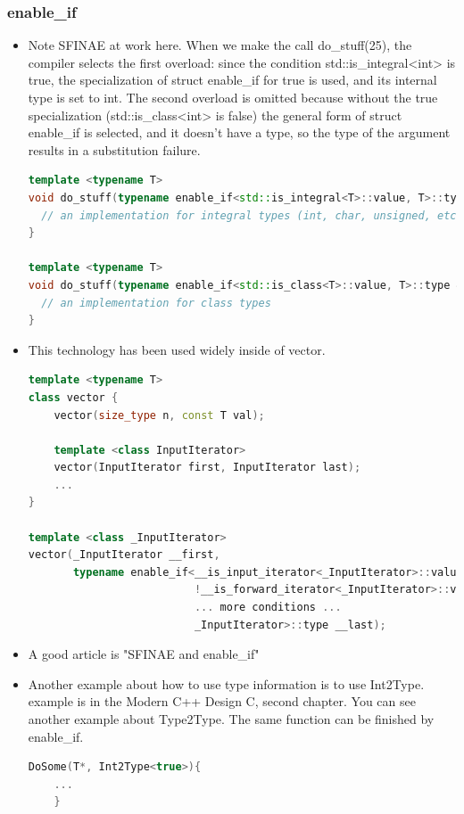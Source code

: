 \documentclass[a4paper,12pt,twoside]{book}
\begin{document}
\subsubsection{enable\_if}
\begin{itemize}

\item Note SFINAE at work here. When we make the call do\_stuff(25), the compiler selects the first overload: since the condition std::is\_integral<int> is true, the specialization of struct enable\_if for true is used, and its internal type is set to int. The second overload is omitted because without the true specialization (std::is\_class<int> is false) the general form of struct enable\_if is selected, and it doesn't have a type, so the type of the argument results in a substitution failure.

\begin{lstlisting}[frame=single, language=c++]
template <typename T>
void do_stuff(typename enable_if<std::is_integral<T>::value, T>::type &t) {
  // an implementation for integral types (int, char, unsigned, etc.)
}

template <typename T>
void do_stuff(typename enable_if<std::is_class<T>::value, T>::type &t) {
  // an implementation for class types
}
\end{lstlisting}

\item This technology has been used widely inside of vector.
\begin{lstlisting}[frame=single, language=c++]
template <typename T>
class vector {
    vector(size_type n, const T val);

    template <class InputIterator>
    vector(InputIterator first, InputIterator last);
    ...
}

template <class _InputIterator>
vector(_InputIterator __first,
       typename enable_if<__is_input_iterator<_InputIterator>::value &&
                          !__is_forward_iterator<_InputIterator>::value &&
                          ... more conditions ...
                          _InputIterator>::type __last);
\end{lstlisting}

\item A good article is "SFINAE and enable\_if"

\item Another example about how to use type information is to use Int2Type. example is in the Modern C++ Design C, second chapter. You can see another example about Type2Type. The same function can be finished by enable\_if. 
	\begin{lstlisting}[frame=single, language=c++]
DoSome(T*, Int2Type<true>){
	...
	}


\end{lstlisting}
\end{itemize}
\end{document}
